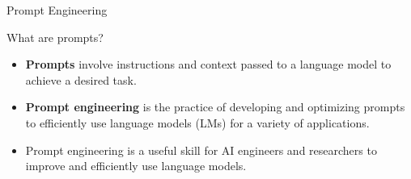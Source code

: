 \begin{frame}[plain]
  \centering
  \vspace{3cm}
  {\LARGE Prompt Engineering}
\end{frame}

\begin{frame}{What are prompts?}
  \begin{itemize}
    \item[\textcolor{red}{$\blacktriangleright$}] \textbf{Prompts} involve instructions and context passed to a language model to achieve a desired task.
    \vspace{0.5em}
    \item[\textcolor{red}{$\blacktriangleright$}] \textbf{Prompt engineering} is the practice of developing and optimizing prompts to efficiently use language models (LMs) for a variety of applications.
    \vspace{0.5em}
    \item[\textcolor{red}{$\blacktriangleright$}] Prompt engineering is a useful skill for AI engineers and researchers to improve and efficiently use language models.
  \end{itemize}
\end{frame}
